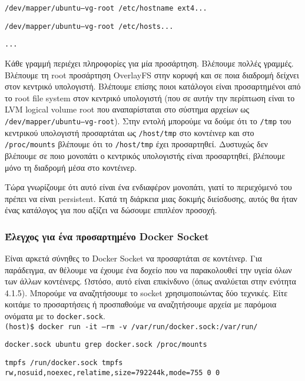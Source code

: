 \texttt{\textlatin{/dev/mapper/ubuntu--vg-root /etc/hostname ext4...}}

\texttt{\textlatin{/dev/mapper/ubuntu--vg-root /etc/hosts...}}

\texttt{\textlatin{...}}



Κάθε γραμμή περιέχει πληροφορίες για μία προσάρτηση. Βλέπουμε πολλές γραμμές.
Βλέπουμε τη \textlatin{root} προσάρτηση \textlatin{OverlayFS} στην κορυφή και σε
ποια διαδρομή δείχνει στον κεντρικό υπολογιστή. Βλέπουμε επίσης ποιοι κατάλογοι
είναι προσαρτημένοι από το \textlatin{root file system} στον κεντρικό υπολογιστή
(που σε αυτήν την περίπτωση είναι το \textlatin{LVM logical volume root} που
αναπαρίσταται στο σύστημα αρχείων ως
\texttt{\textlatin{/dev/mapper/ubuntu--vg-root}}). Στην εντολή μπορούμε να δούμε
ότι το \texttt{\textlatin{/tmp}} του κεντρικού υπολογιστή προσαρτάται ως
\texttt{\textlatin{/host/tmp}} στο κοντέινερ και στο
\texttt{\textlatin{/proc/mounts}} βλέπουμε ότι το \texttt{\textlatin{/host/tmp}}
έχει προσαρτηθεί. Δυστυχώς δεν βλέπουμε σε ποιο μονοπάτι ο κεντρικός υπολογιστής
είναι προσαρτηθεί, βλέπουμε μόνο τη διαδρομή μέσα στο κοντέινερ.

Τώρα γνωρίζουμε ότι αυτό είναι ένα ενδιαφέρον μονοπάτι, γιατί το περιεχόμενό του
πρέπει να είναι \textlatin{persistent}. Κατά τη διάρκεια μιας δοκιμής
διείσδυσης, αυτός θα ήταν ένας κατάλογος για που αξίζει να δώσουμε επιπλέον
προσοχή.


\subsubsection{Έλεγχος για ένα προσαρτημένο \textlatin{Docker Socket}}


Είναι αρκετά σύνηθες το \textlatin{Docker Socket} να προσαρτάται σε κοντέινερ.
Για παράδειγμα, αν θέλουμε να έχουμε ένα δοχείο που να παρακολουθεί την υγεία
όλων των άλλων κοντέινερς. Ωστόσο, αυτό είναι επικίνδυνο (όπως αναλύεται στην
ενότητα 4.1.5). Μπορούμε να αναζητήσουμε το \textlatin{socket} χρησιμοποιώντας
δύο τεχνικές. Είτε κοιτάμε το προσαρτήσεις ή προσπαθούμε να αναζητήσουμε αρχεία
με παρόμοια ονόματα με το \texttt{\textlatin{docker.sock}}. \\

\texttt{\textlatin{(host)\$ docker run -it --rm -v /var/run/docker.sock:/var/run/}}

\texttt{\textlatin{docker.sock ubuntu grep docker.sock /proc/mounts}}

\texttt{\textlatin{tmpfs /run/docker.sock tmpfs rw,nosuid,noexec,relatime,size=792244k,mode=755 0 0}} \\

